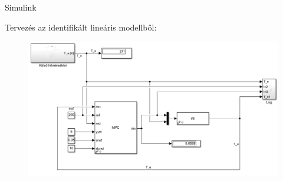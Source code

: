 \documentclass[14pt,handout]{beamer}
\begin{document}
\begin{frame}{Simulink}

Tervezés az identifikált lineáris modellből:



\begin{figure}
	\centering
	\includegraphics[width=\textwidth]{picture/3-simModel.PNG}	
\end{figure}

\end{frame}
\end{document}
